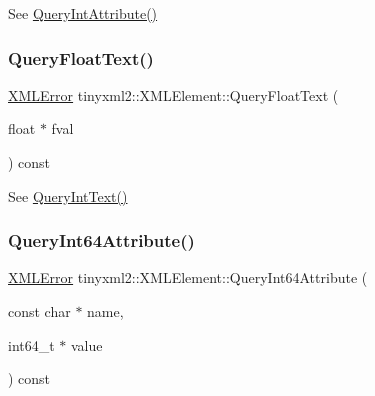 See \mbox{\hyperlink{classtinyxml2_1_1_x_m_l_element_a8a78bc1187c1c45ad89f2690eab567b1}{Query\+Int\+Attribute()}} 

\mbox{\label{classtinyxml2_1_1_x_m_l_element_afa332afedd93210daa6d44b88eb11e29}} 
\subsubsection{\texorpdfstring{Query\+Float\+Text()}{QueryFloatText()}}
{\footnotesize\ttfamily \mbox{\hyperlink{namespacetinyxml2_a1fbf88509c3ac88c09117b1947414e08}{X\+M\+L\+Error}} tinyxml2\+::\+X\+M\+L\+Element\+::\+Query\+Float\+Text (\begin{DoxyParamCaption}\item[{float $\ast$}]{fval }\end{DoxyParamCaption}) const}



See \mbox{\hyperlink{classtinyxml2_1_1_x_m_l_element_a926357996bef633cb736e1a558419632}{Query\+Int\+Text()}} 

\mbox{\label{classtinyxml2_1_1_x_m_l_element_a7c0955d80b6f8d196744eacb0f6e90a8}} 
\subsubsection{\texorpdfstring{Query\+Int64\+Attribute()}{QueryInt64Attribute()}}
{\footnotesize\ttfamily \mbox{\hyperlink{namespacetinyxml2_a1fbf88509c3ac88c09117b1947414e08}{X\+M\+L\+Error}} tinyxml2\+::\+X\+M\+L\+Element\+::\+Query\+Int64\+Attribute (\begin{DoxyParamCaption}\item[{const char $\ast$}]{name,  }\item[{int64\+\_\+t $\ast$}]{value }\end{DoxyParamCaption}) const\hspace{0.3cm}{\ttfamily [inline]}}



